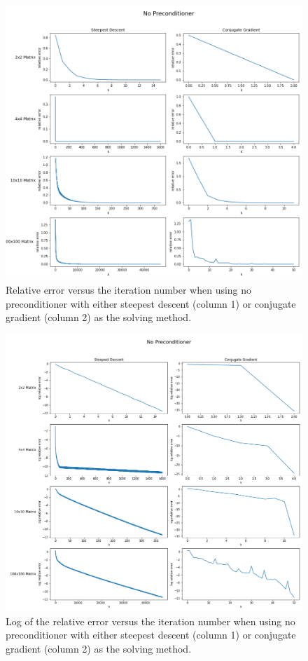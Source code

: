\documentclass[11pt]{article}
\begin{document}
\begin{figure}[h!]
	\hspace*{-2cm}
	\centering
	\includegraphics[width=1.1\linewidth]{../figures/No Preconditioner}
	\caption{Relative error versus the iteration number when using no preconditioner with either steepest descent (column 1) or conjugate gradient (column 2) as the solving method.}
	\label{fig:None}
\end{figure}

\begin{figure}[h!]
	\hspace*{-3cm}
	\centering
	\includegraphics[width=1.3\linewidth]{../figures/Log No Preconditioner}
	\caption{Log of the relative error versus the iteration number when using no preconditioner with either steepest descent (column 1) or conjugate gradient (column 2) as the solving method.}
	\label{fig:LogNone}
\end{figure}
\end{document}
